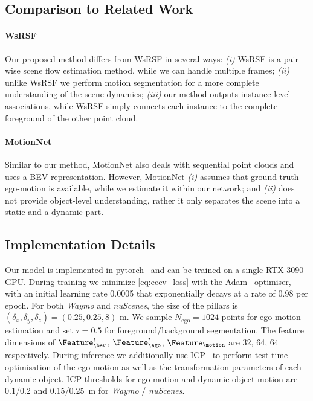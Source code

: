 \subsection{Comparison to Related Work}
\paragraph{WsRSF~\cite{gojcic2021weakly}} Our proposed method differs from WsRSF in several ways: \textit{(i)} WsRSF is a pair-wise scene flow estimation method, while we can handle multiple frames; \textit{(ii)} unlike WsRSF we perform motion segmentation for a more complete understanding of the scene dynamics; \textit{(iii)} our method outputs instance-level associations, while WsRSF simply connects each instance to the complete foreground of the other point cloud.

\paragraph{MotionNet~\cite{wu2020motionnet}} Similar to our method, MotionNet also deals with sequential point clouds and uses a BEV representation. However, MotionNet \textit{(i)} assumes that ground truth ego-motion is available, while we estimate it within our network; and \textit{(ii)} does not provide object-level understanding, rather it only separates the scene into a static and a dynamic part. 

\subsection{Implementation Details}
Our model is implemented in pytorch~\cite{NEURIPS2019_9015} and can be trained on a single RTX 3090 GPU. During training we minimize \cref{eq:eccv_loss} with the Adam~\cite{kingma2014adam} optimiser, with an initial learning rate 0.0005 that exponentially decays at a rate of 0.98 per epoch. For both \emph{Waymo} and \emph{nuScenes}, the size of the pillars is $(\delta_x, \delta_y, \delta_z) = (0.25, 0.25, 8)$ m. We sample $N_{\text{ego}} = 1024$ points for ego-motion estimation and set $\tau =0.5$ for foreground/background segmentation. The feature dimensions of $\Feature_\bev^t$, $\Feature_\ego^t$, $\Feature_\motion$ are 32, 64, 64 respectively. During inference we additionally use ICP~\cite{besl1992method} to perform test-time optimisation of the ego-motion as well as the transformation parameters of each dynamic object. ICP thresholds for ego-motion and dynamic object motion are 0.1/0.2 and 0.15/0.25 $\,$m for \emph{Waymo} / \emph{nuScenes}. 




